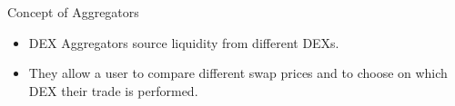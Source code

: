 \documentclass[]{beamer}
\begin{document}
\begin{frame}{Concept of Aggregators}
\begin{figure}
	\centering
	\resizebox{0.8\textwidth}{!}{
	\begin{tikzpicture}[scale=1.0, every node/.style={scale=1.0}]
			
	\end{tikzpicture}}
\end{figure}
	
\begin{itemize}
	\item DEX Aggregators source liquidity from different DEXs.
	\item They allow a user to compare different swap prices and to choose on which DEX their trade is performed.
\end{itemize}

\end{frame}
\end{document}
